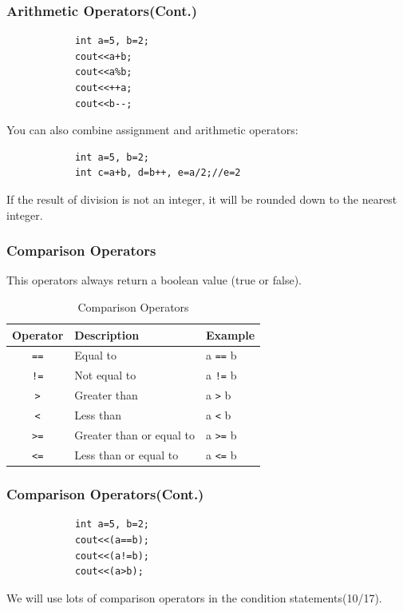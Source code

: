 \documentclass[xcolor=dvipsnames]{beamer}
\begin{document}
    \begin{frame}[fragile]
        \frametitle{Arithmetic Operators(Cont.)}
        \begin{verbatim}
            int a=5, b=2;
            cout<<a+b;
            cout<<a%b;
            cout<<++a;
            cout<<b--;
        \end{verbatim}
        You can also combine assignment and arithmetic operators:
        \begin{verbatim}
            int a=5, b=2;
            int c=a+b, d=b++, e=a/2;//e=2
        \end{verbatim}
        If the result of division is not an integer, it will be rounded down to the nearest integer.
    \end{frame}
    \begin{frame}
        \frametitle{Comparison Operators}
        \begin{table}[h]
        \centering
        \caption{Comparison Operators}
        This operators always return a boolean value (true or false).
        \begin{tabular}{cll}
        \toprule
        \textbf{Operator} & \textbf{Description} & \textbf{Example} \\
         \midrule
            \texttt{==} & Equal to & a \texttt{==} b \\
            \texttt{!=} & Not equal to & a \texttt{!=} b \\
            \texttt{>}  & Greater than & a \texttt{>} b \\
            \texttt{<}  & Less than & a \texttt{<} b \\
            \texttt{>=} & Greater than or equal to & a \texttt{>=} b \\
            \texttt{<=} & Less than or equal to & a \texttt{<=} b \\
        \bottomrule
        \end{tabular}
        \end{table}
    \end{frame}
    \begin{frame}[fragile]
        \frametitle{Comparison Operators(Cont.)}
        \begin{verbatim}
            int a=5, b=2;
            cout<<(a==b);
            cout<<(a!=b);
            cout<<(a>b);
        \end{verbatim}
        We will use lots of comparison operators in the condition statements(10/17).
    \end{frame}
\end{document}
